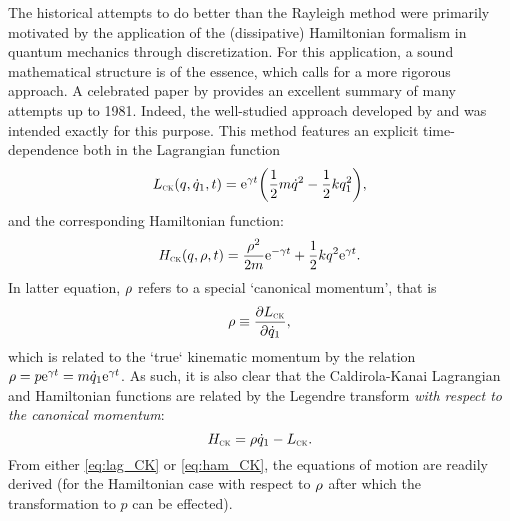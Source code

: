 The historical attempts to do better than the Rayleigh method were primarily motivated by the application of the (dissipative) Hamiltonian formalism in quantum mechanics through discretization. For this application, a sound mathematical structure is of the essence, which calls for a more rigorous approach. A celebrated paper by
\citet{Dekker1981} provides an excellent summary of many attempts up to 1981. Indeed, the well-studied approach developed by \citet{Caldirola1941} and \citet{Kanai1948} was intended exactly for this purpose. This method features an explicit time-dependence both in the Lagrangian function
\begin{equation}
    L_\text{\tiny{\textsc{CK}}}(q, \dot{q}_1, t) = \mathrm{e}^{\gamma t}\qty(\frac{1}{2}m\dot{q}^2 - \frac{1}{2}kq_1^2),
    \label{eq:lag_CK}
\end{equation}
and the corresponding Hamiltonian function:
\begin{equation}
    H_\text{\tiny{\textsc{CK}}}(q, \rho, t) = \frac{\rho^2}{2m}\mathrm{e}^{-\gamma t} + \frac{1}{2}kq^2\mathrm{e}^{\gamma t}.
    \label{eq:ham_CK}
\end{equation}
In latter equation, $\rho$ refers to a special `canonical momentum', that is
\begin{equation}
    \rho \equiv \pdv{\ensuremath{L_\text{\tiny{\textsc{CK}}}}}{\dot{q}_1},
    \label{eq:can_momentum}
\end{equation}
which is related to the `true` kinematic momentum by the relation $\rho = p\mathrm{e}^{\gamma
t} = m\dot{q}_1\mathrm{e}^{\gamma t}$. As such, it is also clear that the Caldirola-Kanai Lagrangian and Hamiltonian functions are related by the Legendre transform \emph{with respect to the canonical momentum}:
$$ H_\text{\tiny{\textsc{CK}}} = \rho \dot{q}_1 - L_\text{\tiny{\textsc{CK}}}. $$
From either \cref{eq:lag_CK} or \cref{eq:ham_CK}, the equations of motion are readily
derived (for the Hamiltonian case with respect to $\rho$ after which the transformation to $p$ can be effected).
